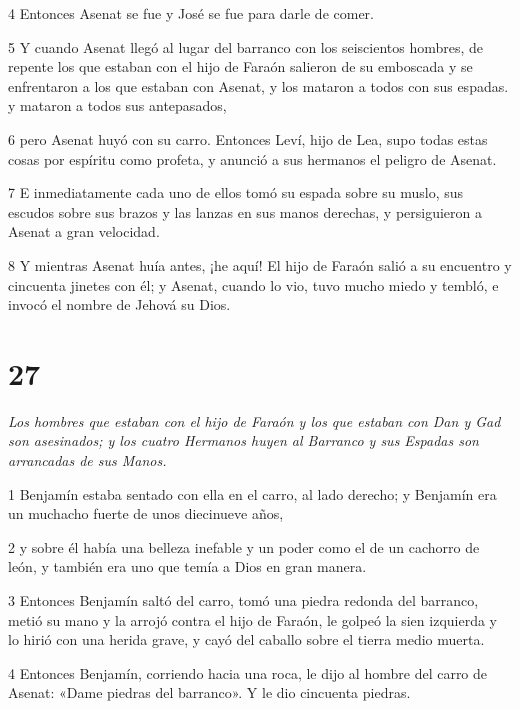 \par 4 Entonces Asenat se fue y José se fue para darle de comer.

\par 5 Y cuando Asenat llegó al lugar del barranco con los seiscientos hombres, de repente los que estaban con el hijo de Faraón salieron de su emboscada y se enfrentaron a los que estaban con Asenat, y los mataron a todos con sus espadas. y mataron a todos sus antepasados,

\par 6 pero Asenat huyó con su carro. Entonces Leví, hijo de Lea, supo todas estas cosas por espíritu como profeta, y anunció a sus hermanos el peligro de Asenat.

\par 7 E inmediatamente cada uno de ellos tomó su espada sobre su muslo, sus escudos sobre sus brazos y las lanzas en sus manos derechas, y persiguieron a Asenat a gran velocidad.

\par 8 Y mientras Asenat huía antes, ¡he aquí! El hijo de Faraón salió a su encuentro y cincuenta jinetes con él; y Asenat, cuando lo vio, tuvo mucho miedo y tembló, e invocó el nombre de Jehová su Dios.

\chapter{27}

\par \textit{Los hombres que estaban con el hijo de Faraón y los que estaban con Dan y Gad son asesinados; y los cuatro Hermanos huyen al Barranco y sus Espadas son arrancadas de sus Manos.}


\par 1 Benjamín estaba sentado con ella en el carro, al lado derecho; y Benjamín era un muchacho fuerte de unos diecinueve años,

\par 2 y sobre él había una belleza inefable y un poder como el de un cachorro de león, y también era uno que temía a Dios en gran manera.

\par 3 Entonces Benjamín saltó del carro, tomó una piedra redonda del barranco, metió su mano y la arrojó contra el hijo de Faraón, le golpeó la sien izquierda y lo hirió con una herida grave, y cayó del caballo sobre el tierra medio muerta.

\par 4 Entonces Benjamín, corriendo hacia una roca, le dijo al hombre del carro de Asenat: «Dame piedras del barranco». Y le dio cincuenta piedras.

